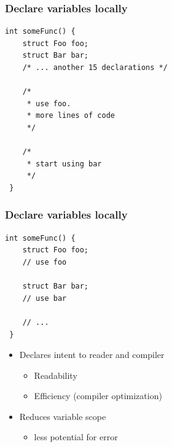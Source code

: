 \documentclass[table]{beamer}
\newcounter{rulecount}
\newcommand{\declarerule}{\textbf{\color{themeblue}{Rule \therulecount:}} }
\begin{document}



\begin{frame}[fragile]
    \frametitle{\declarerule Declare variables locally}
    \begin{lstlisting}[title=In ANSI C variables must be declared at the beginning of scope]
int someFunc() {
    struct Foo foo;
    struct Bar bar;
    /* ... another 15 declarations */

    /* 
     * use foo.
     * more lines of code
     */

    /* 
     * start using bar
     */
 }
    \end{lstlisting}
\end{frame}

\begin{frame}[fragile]
    \frametitle{\declarerule Declare variables locally}
    \begin{lstlisting}[title=In C++ variables can be declared in the middle of scope where they are used]
int someFunc() {
    struct Foo foo;
    // use foo

    struct Bar bar;
    // use bar

    // ...
 }
    \end{lstlisting}
    \begin{itemize}
        \item Declares intent to reader and compiler
            \begin{itemize}
                \item \alert{Readability}
                \item \alert{Efficiency} (compiler optimization)
            \end{itemize}
        \item Reduces variable scope
            \begin{itemize}
                \item less potential for error
            \end{itemize}
    \end{itemize}
\end{frame}

\end{document}

